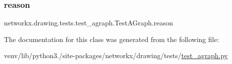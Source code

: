 \subsubsection{\texorpdfstring{reason}{reason}}
{\footnotesize\ttfamily networkx.\+drawing.\+tests.\+test\+\_\+agraph.\+Test\+A\+Graph.\+reason\hspace{0.3cm}{\ttfamily [static]}}



The documentation for this class was generated from the following file\+:\begin{DoxyCompactItemize}
\item 
venv/lib/python3./site-\/packages/networkx/drawing/tests/\hyperlink{test__agraph_8py}{test\+\_\+agraph.\+py}\end{DoxyCompactItemize}
